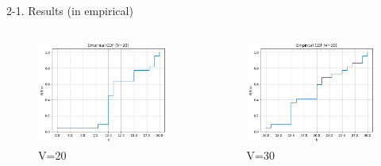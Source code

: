 \documentclass{beamer}
\begin{document}
\begin{frame}{2-1. Results (in empirical)}
\begin{columns}[T,onlytextwidth]
  \begin{figure}
    \centering
    \includegraphics[width=\linewidth]{332Project1/figures/v=20.png}
    \caption{V=20}\label{fig:v20}
  \end{figure}

  \begin{figure}
    \centering
    \includegraphics[width=\linewidth]{332Project1/figures/v=30.png}
    \caption{V=30}\label{fig:v30}
  \end{figure}
\end{columns}
\end{frame}
\end{document}
